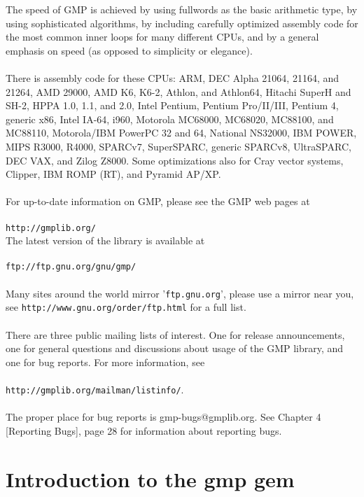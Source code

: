 \documentclass[pdftex,10pt]{article}
\begin{document}
The speed of GMP is achieved by using fullwords as the basic arithmetic type,
by using sophisticated algorithms, by including carefully optimized assembly
code for the most common inner loops for many different CPUs, and by a general
emphasis on speed (as opposed to simplicity or elegance).\\
\\
There is assembly code for these CPUs: ARM, DEC Alpha 21064, 21164, and 21264,
AMD 29000, AMD K6, K6-2, Athlon, and Athlon64, Hitachi SuperH and SH-2, HPPA
1.0, 1.1, and 2.0, Intel Pentium, Pentium Pro/II/III, Pentium 4, generic x86,
Intel IA-64, i960, Motorola MC68000, MC68020, MC88100, and MC88110,
Motorola/IBM PowerPC 32 and 64, National NS32000, IBM POWER, MIPS R3000, R4000,
SPARCv7, SuperSPARC, generic SPARCv8, UltraSPARC, DEC VAX, and Zilog Z8000.
Some optimizations also for Cray vector systems, Clipper, IBM ROMP (RT), and
Pyramid AP/XP.\\
\\
For up-to-date information on GMP, please see the GMP web pages at\\
\\
\indent \texttt{http://gmplib.org/}\\

The latest version of the library is available at\\
\\
\texttt{ftp://ftp.gnu.org/gnu/gmp/}\\
\\
Many sites around the world mirror '\texttt{ftp.gnu.org}', please use a mirror
near you, see \texttt{http://www.gnu.org/order/ftp.html} for a full list.\\
\\
There are three public mailing lists of interest. One for release
announcements, one for general questions and discussions about usage of the GMP
library, and one for bug reports. For more information, see\\
\\
\texttt{http://gmplib.org/mailman/listinfo/}.\\
\\
The proper place for bug reports is gmp-bugs@gmplib.org. See Chapter 4
[Reporting Bugs], page 28 for information about reporting bugs.

\section{Introduction to the gmp gem}
\end{document}
